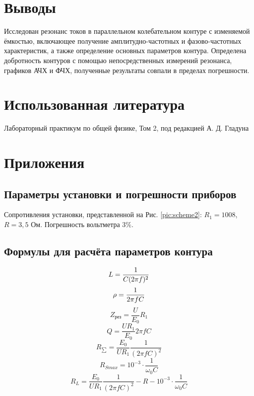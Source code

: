 \documentclass[12pt]{article}
\begin{document}
\section{Выводы}
Исследован резонанс токов в параллельном колебательном контуре с изменяемой
ёмкостью, включающее получение амплитудно-частотных и фазово-частотных характеристик, 
а также определение основных параметров контура.
Определена добротность контуров с помощью непосредственных измерений резонанса, графиков АЧХ
и ФЧХ, полученные результаты совпали в пределах погрешности. 


\section{Использованная литература}
\begin{thebibliography}{9}
    Лабораторный практикум по общей физике, Том 2, под редакцией А. Д. Гладуна
\end{thebibliography}

\section{Приложения}
\subsection{Параметры установки и погрешности приборов} \label{app_1}
Сопротивления установки, представленной на Рис. \ref{pic:scheme2}: $R_1 = 1008$, $R = 3,5$ Ом.
Погрешность вольтметра $3\%$.

\subsection{Формулы для расчёта параметров контура} \label{app_2}
\begin{equation}\label{}
    L=\frac{1}{C(2\pi f)^2} \\
\end{equation}
\begin{equation}\label{}
    \rho=\frac{1}{2\pi fC} \\
\end{equation}
\begin{equation}\label{}
    Z_{\text{рез}}=\frac{U}{E_0}R_1
\end{equation}
\begin{equation}\label{}
    Q=\frac{UR_1}{E_0}2\pi fC
\end{equation}
\begin{equation}\label{}
    R_{\sum}=\frac{E_0}{UR_1}\frac{1}{(2\pi fC)^2}
\end{equation}
\begin{equation}\label{}
    R_{Smax}=10^{-3}\cdot\frac{1}{\omega_0C}
\end{equation}
\begin{equation}\label{}
    R_L=\frac{E_0}{UR_1}\frac{1}{(2\pi fC)^2}-R-10^{-3}\cdot\frac{1}{\omega_0C}
\end{equation}
\end{document}
